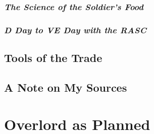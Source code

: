 \documentclass[noraggedright]{turabian-researchpaper}
\begin{document}
		\subsubsection{\textit{The Science of the Soldier's Food}}
		\subsubsection{\textit{D Day to VE Day with the RASC}}
	
		

		

	\subsection{Tools of the Trade} %

	
	\subsection{A Note on My Sources}
		



\section{Overlord as Planned} %




\end{document}
